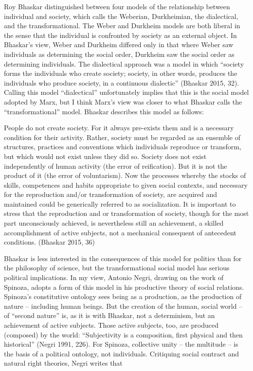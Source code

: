 \documentclass[12pt,oneside]{memoir}
\begin{document}
	Roy Bhaskar distinguished between four models of the relationship between individual and society, which calls the Weberian, Durkheimian, the dialectical, and the transformational. The Weber and Durkheim models are both liberal in the sense that the individual is confronted by society as an external object. In Bhaskar's view, Weber and Durkheim differed only in that where Weber saw individuals as determining the social order, Durkheim saw the social order as determining individuals. The dialectical approach was a model in which ``society forms the individuals who create society; society, in other words, produces the individuals who produce society, in a continuous dialectic'' (Bhaskar 2015, 32). Calling this model ``dialectical'' unfortunately implies that this is the social model adopted by Marx, but I think Marx's view was closer to what Bhaskar calls the ``transformational'' model. Bhaskar describes this model as follows:

People do not create society. For it always pre-exists them and is a necessary condition for their activity. Rather, society must be regarded as an ensemble of structures, practices and conventions which individuals reproduce or transform, but which would not exist unless they did so. Society does not exist independently of human activity (the error of reification). But it is not the product of it (the error of voluntarism). Now the processes whereby the stocks of skills, competences and habits appropriate to given social contexts, and necessary for the reproduction and/or transformation of society, are acquired and maintained could be generically referred to as socialization. It is important to stress that the reproduction and or transformation of society, though for the most part unconsciously achieved, is nevertheless still an achievement, a skilled accomplishment of active subjects, not a mechanical consequent of antecedent conditions. (Bhaskar 2015, 36)

Bhaskar is less interested in the consequences of this model for politics than for the philosophy of science, but the transformational social model has serious political implications. In my view, Antonio Negri, drawing on the work of Spinoza, adopts a form of this model in his productive theory of social relations. Spinoza's constitutive ontology sees being as a production, as the production of nature -- including human beings. But the creation of the human, social world -- of ``second nature'' is, as it is with Bhaskar, not a determinism, but an achievement of active subjects. Those active subjects, too, are produced (composed) by the world: ``Subjectivity is a composition, first physical and then historical'' (Negri 1991, 226). For Spinoza, collective unity -- the multitude -- is the basis of a political ontology, not individuals. Critiquing social contract and natural right theories, Negri writes that 
\end{document}
